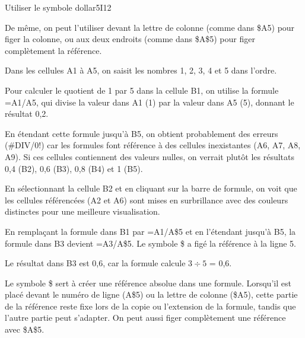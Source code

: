 \begin{EXO}{Utiliser le symbole dollar}{5I12}
\begin{MultiColonnes}{2}
\begin{tcbenumerate}[1][8]
\begin{crep}[extra lines=2]
        De même, on peut l'utiliser devant la lettre de colonne (comme dans \$A5) pour figer la colonne, ou aux deux endroits (comme dans \$A\$5) pour figer complètement la référence.
        \end{crep}
    \end{tcbenumerate}
\end{MultiColonnes}

\exocorrection

\begin{tcbenumerate}[1]
    \tcbitem Dans les cellules A1 à A5, on saisit les nombres 1, 2, 3, 4 et 5 dans l'ordre.
    
    \tcbitem Pour calculer le quotient de 1 par 5 dans la cellule B1, on utilise la formule =A1/A5, qui divise la valeur dans A1 (1) par la valeur dans A5 (5), donnant le résultat 0,2.
    
    \tcbitem En étendant cette formule jusqu'à B5, on obtient probablement des erreurs (\#DIV/0!) car les formules font référence à des cellules inexistantes (A6, A7, A8, A9). Si ces cellules contiennent des valeurs nulles, on verrait plutôt les résultats 0,4 (B2), 0,6 (B3), 0,8 (B4) et 1 (B5).
    
    \tcbitem En sélectionnant la cellule B2 et en cliquant sur la barre de formule, on voit que les cellules référencées (A2 et A6) sont mises en surbrillance avec des couleurs distinctes pour une meilleure visualisation.
    
    \tcbitem En remplaçant la formule dans B1 par =A1/A\$5 et en l'étendant jusqu'à B5, la formule dans B3 devient =A3/A\$5. Le symbole \$ a figé la référence à la ligne 5.
    
    \tcbitem Le résultat dans B3 est 0,6, car la formule calcule $3 \div 5$ = 0,6.
    
    \tcbitem Le symbole \$ sert à créer une référence absolue dans une formule. Lorsqu'il est placé devant le numéro de ligne (A\$5) ou la lettre de colonne (\$A5), cette partie de la référence reste fixe lors de la copie ou l'extension de la formule, tandis que l'autre partie peut s'adapter. On peut aussi figer complètement une référence avec \$A\$5.
\end{tcbenumerate}

\end{EXO}
